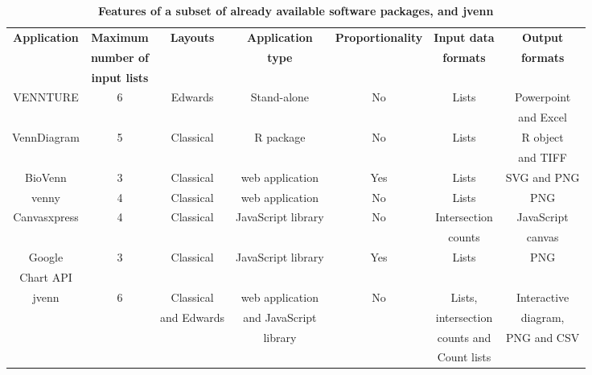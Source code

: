\documentclass[11pt]{bmc_article_s50}
\begin{document}
\begin{sidewaystable}[]
\caption{\bf Features of a subset of already available software packages, and
jvenn}\label{tab1}
    \begin{tabular*}
{\textwidth}{@{\extracolsep\fill}ccccccc@{\extracolsep\fill}}
    \hline
\textbf{Application}&\textbf{Maximum}&\textbf{Layouts}&\textbf{ Application }&
        \textbf{Proportionality}&\textbf{Input data}&\textbf{Output}\\
        & \textbf{number of}&\textbf{}&\textbf{type}&\textbf{}&\textbf{formats}&\textbf{formats }\\
        & \textbf{input lists} & & & & & \\ \hline

        VENNTURE \cite{Bronwen2012} &  6 & Edwards & Stand-alone & No & Lists &
        Powerpoint\\
        & & & & & & and Excel \\ \hline

        VennDiagram \cite{RVennDiagram} &  5 & Classical & R package & No & Lists
        & R object \\
        & & & & & & and TIFF \\ \hline

        BioVenn \cite{Hulsen2008} &  3 & Classical & web application & Yes &
        Lists & SVG and PNG \\ \hline

        venny \cite{venny} &  4 & Classical & web application & No &
        Lists & PNG \\ \hline

        Canvasxpress \cite{canvasxpress} &  4 & Classical & JavaScript library &
        No & Intersection & JavaScript \\
        & & & & & counts & canvas \\ \hline

        Google & 3 & Classical & JavaScript library &
        Yes & Lists & PNG \\
        Chart API \cite{googleAPI} & & & & & & \\ \hline

        jvenn & 6 & Classical & web application & No & Lists,
        & Interactive
        \\
        & & and Edwards & and JavaScript & & intersection & diagram, \\
        & & & library & & counts and & PNG and CSV \\
        & & & & & Count lists &\\
        \hline
    \end{tabular*}
\end{sidewaystable}{\pagebreak} 
\end{document}
